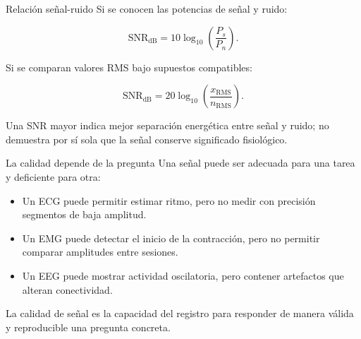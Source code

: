 \documentclass[
  ignorenonframetext,
  aspectratio=169,
  spanish,
  professionalfonts]{beamer}
\providecommand{\tightlist}{%
  \setlength{\itemsep}{0pt}\setlength{\parskip}{0pt}}
\begin{document}
\begin{frame}{Relación señal-ruido}
\protect{}\label{relaciuxf3n-seuxf1al-ruido}
Si se conocen las potencias de señal y ruido:

\[
\mathrm{SNR}_{\mathrm{dB}}
=10\log_{10}\left(\frac{P_s}{P_n}\right).
\]

Si se comparan valores RMS bajo supuestos compatibles:

\[
\mathrm{SNR}_{\mathrm{dB}}
=20\log_{10}\left(\frac{x_{\mathrm{RMS}}}{n_{\mathrm{RMS}}}\right).
\]

\begin{tcolorbox}[enhanced jigsaw, arc=.35mm, bottomrule=.15mm, bottomtitle=1mm, breakable, colback=white, colbacktitle=quarto-callout-note-color!10!white, colframe=quarto-callout-note-color-frame, coltitle=black, left=2mm, leftrule=.75mm, opacityback=0, opacitybacktitle=0.6, rightrule=.15mm, title={Lectura correcta}, titlerule=0mm, toprule=.15mm, toptitle=1mm]

Una SNR mayor indica mejor separación energética entre señal y ruido; no
demuestra por sí sola que la señal conserve significado fisiológico.

\end{tcolorbox}
\end{frame}

\begin{frame}{La calidad depende de la pregunta}
\protect{}\label{la-calidad-depende-de-la-pregunta}
Una señal puede ser adecuada para una tarea y deficiente para otra:

\begin{itemize}
\tightlist
\item
  Un ECG puede permitir estimar ritmo, pero no medir con precisión
  segmentos de baja amplitud.
\item
  Un EMG puede detectar el inicio de la contracción, pero no permitir
  comparar amplitudes entre sesiones.
\item
  Un EEG puede mostrar actividad oscilatoria, pero contener artefactos
  que alteran conectividad.
\end{itemize}

\begin{tcolorbox}[enhanced jigsaw, arc=.35mm, bottomrule=.15mm, bottomtitle=1mm, breakable, colback=white, colbacktitle=quarto-callout-important-color!10!white, colframe=quarto-callout-important-color-frame, coltitle=black, left=2mm, leftrule=.75mm, opacityback=0, opacitybacktitle=0.6, rightrule=.15mm, title={Definición operativa}, titlerule=0mm, toprule=.15mm, toptitle=1mm]

La calidad de señal es la capacidad del registro para responder de
manera válida y reproducible una pregunta concreta.

\end{tcolorbox}
\end{frame}
\end{document}
